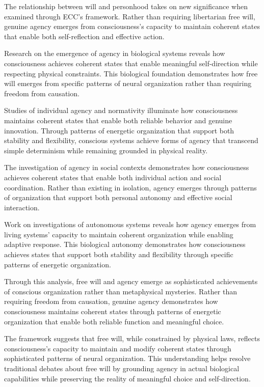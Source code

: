 \begin{refsection}
The relationship between will and personhood \cite{Frankfurt1971} takes on new significance when examined through ECC's framework. Rather than requiring libertarian free will, genuine agency emerges from consciousness's capacity to maintain coherent states that enable both self-reflection and effective action.

Research on the emergence of agency in biological systems \cite{Barandiaran2009} reveals how consciousness achieves coherent states that enable meaningful self-direction while respecting physical constraints. This biological foundation demonstrates how free will emerges from specific patterns of neural organization rather than requiring freedom from causation.

Studies of individual agency and normativity \cite{Taylor1985} illuminate how consciousness maintains coherent states that enable both reliable behavior and genuine innovation. Through patterns of energetic organization that support both stability and flexibility, conscious systems achieve forms of agency that transcend simple determinism while remaining grounded in physical reality.

The investigation of agency in social contexts \cite{Bandura2001} demonstrates how consciousness achieves coherent states that enable both individual action and social coordination. Rather than existing in isolation, agency emerges through patterns of organization that support both personal autonomy and effective social interaction.

Work on investigations of autonomous systems \cite{Kauffman2000} reveals how agency emerges from living systems' capacity to maintain coherent organization while enabling adaptive response. This biological autonomy demonstrates how consciousness achieves states that support both stability and flexibility through specific patterns of energetic organization.

Through this analysis, free will and agency emerge as sophisticated achievements of conscious organization rather than metaphysical mysteries. Rather than requiring freedom from causation, genuine agency demonstrates how consciousness maintains coherent states through patterns of energetic organization that enable both reliable function and meaningful choice.

The framework suggests that free will, while constrained by physical laws, reflects consciousness's capacity to maintain and modify coherent states through sophisticated patterns of neural organization. This understanding helps resolve traditional debates about free will by grounding agency in actual biological capabilities while preserving the reality of meaningful choice and self-direction.


\end{refsection}
